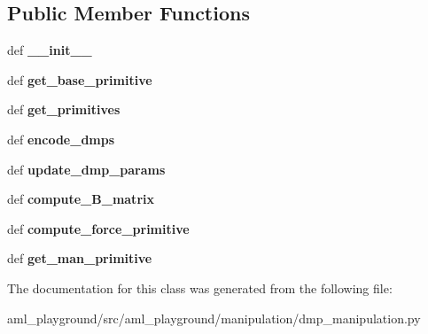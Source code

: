 \subsection*{Public Member Functions}
\begin{DoxyCompactItemize}
\item 
\hypertarget{classaml__playground_1_1manipulation_1_1dmp__manipulation_1_1_d_m_p_manptln_a462e11a6ea557ad5f5b15cb3acbb03ea}{def {\bfseries \-\_\-\-\_\-init\-\_\-\-\_\-}}\label{classaml__playground_1_1manipulation_1_1dmp__manipulation_1_1_d_m_p_manptln_a462e11a6ea557ad5f5b15cb3acbb03ea}

\item 
\hypertarget{classaml__playground_1_1manipulation_1_1dmp__manipulation_1_1_d_m_p_manptln_ae568577811638f019faf611e4383336f}{def {\bfseries get\-\_\-base\-\_\-primitive}}\label{classaml__playground_1_1manipulation_1_1dmp__manipulation_1_1_d_m_p_manptln_ae568577811638f019faf611e4383336f}

\item 
\hypertarget{classaml__playground_1_1manipulation_1_1dmp__manipulation_1_1_d_m_p_manptln_a4dc20c76b11b2e6ee1846919c0f30536}{def {\bfseries get\-\_\-primitives}}\label{classaml__playground_1_1manipulation_1_1dmp__manipulation_1_1_d_m_p_manptln_a4dc20c76b11b2e6ee1846919c0f30536}

\item 
\hypertarget{classaml__playground_1_1manipulation_1_1dmp__manipulation_1_1_d_m_p_manptln_ad953ad33a32c8cb05a2b1ab4357337be}{def {\bfseries encode\-\_\-dmps}}\label{classaml__playground_1_1manipulation_1_1dmp__manipulation_1_1_d_m_p_manptln_ad953ad33a32c8cb05a2b1ab4357337be}

\item 
\hypertarget{classaml__playground_1_1manipulation_1_1dmp__manipulation_1_1_d_m_p_manptln_a1e0ceb843c4cf571afd7d13247274a2d}{def {\bfseries update\-\_\-dmp\-\_\-params}}\label{classaml__playground_1_1manipulation_1_1dmp__manipulation_1_1_d_m_p_manptln_a1e0ceb843c4cf571afd7d13247274a2d}

\item 
\hypertarget{classaml__playground_1_1manipulation_1_1dmp__manipulation_1_1_d_m_p_manptln_aa6d3ef740aa8d7810000bd3c937de599}{def {\bfseries compute\-\_\-\-B\-\_\-matrix}}\label{classaml__playground_1_1manipulation_1_1dmp__manipulation_1_1_d_m_p_manptln_aa6d3ef740aa8d7810000bd3c937de599}

\item 
\hypertarget{classaml__playground_1_1manipulation_1_1dmp__manipulation_1_1_d_m_p_manptln_ae0e2242027fcc274255049b002255b7e}{def {\bfseries compute\-\_\-force\-\_\-primitive}}\label{classaml__playground_1_1manipulation_1_1dmp__manipulation_1_1_d_m_p_manptln_ae0e2242027fcc274255049b002255b7e}

\item 
\hypertarget{classaml__playground_1_1manipulation_1_1dmp__manipulation_1_1_d_m_p_manptln_a0296212f69113a28247d4d2ab61c1303}{def {\bfseries get\-\_\-man\-\_\-primitive}}\label{classaml__playground_1_1manipulation_1_1dmp__manipulation_1_1_d_m_p_manptln_a0296212f69113a28247d4d2ab61c1303}

\end{DoxyCompactItemize}


The documentation for this class was generated from the following file\-:\begin{DoxyCompactItemize}
\item 
aml\-\_\-playground/src/aml\-\_\-playground/manipulation/dmp\-\_\-manipulation.\-py\end{DoxyCompactItemize}
